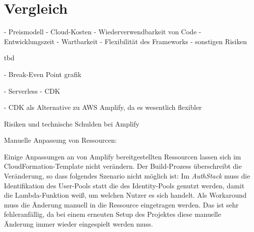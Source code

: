 \chapter{Vergleich}

- Preismodell
- Cloud-Kosten
- Wiederverwendbarkeit von Code
- Entwicklungszeit
- Wartbarkeit
- Flexibilität des Frameworks
- sonstigen Risiken

tbd

- Break-Even Point grafik

- Serverless
- CDK

- CDK als Alternative zu AWS Amplify, da es wesentlich flexibler



Risiken und technische Schulden bei Amplify

Manuelle Anpassung von Ressourcen:

Einige Anpassungen an von Amplify bereitgestellten Ressourcen lassen sich im CloudFormation-Template nicht verändern. Der Build-Prozess überschreibt die Veränderung, so dass folgendes Szenario nicht möglich ist: Im \textit{AuthStack} muss die Identifikation des User-Pools statt die des Identity-Pools genutzt werden, damit die Lambda-Funktion weiß, um welchen Nutzer es sich handelt. Als Workaround muss die Änderung manuell in die Ressource eingetragen werden. Das ist sehr fehleranfällig, da bei einem erneuten Setup des Projektes diese manuelle Änderung immer wieder eingespielt werden muss.